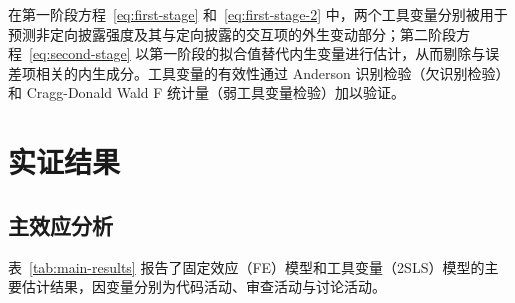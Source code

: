 \documentclass[
    type = master, %
    degree = professional,        %
    decl-page,  %
    twoside,                %
    fontset = fandol %
  ]{njuthesis}
\begin{document}
在第一阶段方程~\eqref{eq:first-stage} 和~\eqref{eq:first-stage-2} 中，两个工具变量分别被用于预测非定向披露强度及其与定向披露的交互项的外生变动部分；第二阶段方程~\eqref{eq:second-stage} 以第一阶段的拟合值替代内生变量进行估计，从而剔除与误差项相关的内生成分。工具变量的有效性通过 Anderson 识别检验（欠识别检验）和 Cragg-Donald Wald F 统计量（弱工具变量检验）加以验证。

\section{实证结果}
\label{sec:results-1}

\subsection{主效应分析}

表~\ref{tab:main-results} 报告了固定效应（FE）模型和工具变量（2SLS）模型的主要估计结果，因变量分别为代码活动、审查活动与讨论活动。
\end{document}
